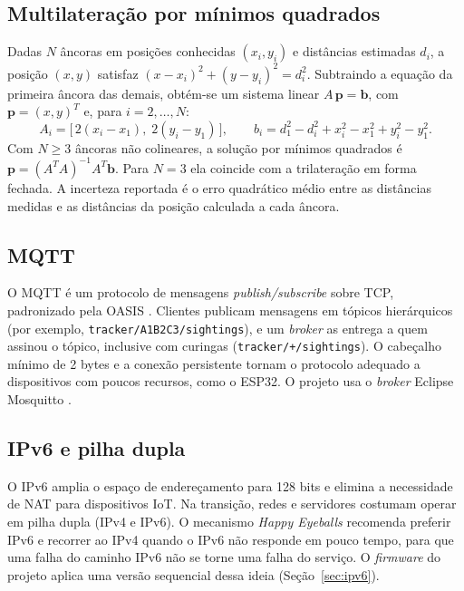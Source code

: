 \documentclass[12pt]{article}
\begin{document}
\subsection{Multilateração por mínimos quadrados}
Dadas $N$ âncoras em posições conhecidas $(x_i, y_i)$ e distâncias estimadas $d_i$, a posição
$(x, y)$ satisfaz $(x-x_i)^2 + (y-y_i)^2 = d_i^2$. Subtraindo a equação da primeira âncora das
demais, obtém-se um sistema linear $A\,\mathbf{p} = \mathbf{b}$, com $\mathbf{p} = (x, y)^T$ e,
para $i = 2, \ldots, N$:
\begin{equation}
  A_i = \big[\,2(x_i - x_1),\; 2(y_i - y_1)\,\big], \qquad
  b_i = d_1^2 - d_i^2 + x_i^2 - x_1^2 + y_i^2 - y_1^2 .
\end{equation}
Com $N \geq 3$ âncoras não colineares, a solução por mínimos quadrados é
$\mathbf{p} = (A^TA)^{-1}A^T\mathbf{b}$. Para $N = 3$ ela coincide com a trilateração em forma
fechada. A incerteza reportada é o erro quadrático médio entre as distâncias medidas e as
distâncias da posição calculada a cada âncora.

\subsection{MQTT}
O MQTT é um protocolo de mensagens \textit{publish/subscribe} sobre TCP, padronizado pela OASIS
\cite{mqtt311}. Clientes publicam mensagens em tópicos hierárquicos (por exemplo,
\texttt{tracker/A1B2C3/sightings}), e um \textit{broker} as entrega a quem assinou o tópico,
inclusive com curingas (\texttt{tracker/+/sightings}). O cabeçalho mínimo de 2 bytes e a conexão
persistente tornam o protocolo adequado a dispositivos com poucos recursos, como o ESP32. O projeto
usa o \textit{broker} Eclipse Mosquitto \cite{light2017mosquitto}.

\subsection{IPv6 e pilha dupla}
O IPv6 \cite{rfc8200} amplia o espaço de endereçamento para 128 bits e elimina a necessidade de NAT
para dispositivos IoT. Na transição, redes e servidores costumam operar em pilha dupla (IPv4 e
IPv6). O mecanismo \textit{Happy Eyeballs} \cite{rfc8305} recomenda preferir IPv6 e recorrer ao
IPv4 quando o IPv6 não responde em pouco tempo, para que uma falha do caminho IPv6 não se torne
uma falha do serviço. O \textit{firmware} do projeto aplica uma versão sequencial dessa ideia
(Seção~\ref{sec:ipv6}).

\end{document}
